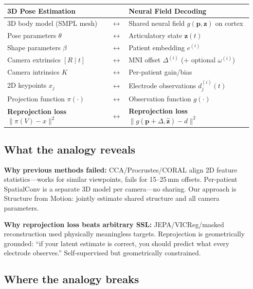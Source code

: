 \documentclass[11pt,letterpaper]{article}
\newcommand{\bfp}{\mathbf{p}}
\newcommand{\bfz}{\mathbf{z}}
\begin{document}
\begin{table}[h]\centering\small
\begin{tabular}{@{}p{}p{}p{}@{}}
\toprule
\textbf{3D Pose Estimation} & & \textbf{Neural Field Decoding} \\
\midrule
3D body model (SMPL mesh) & $\leftrightarrow$ & Shared neural field $g(\bfp, \bfz)$ on cortex \\[3pt]
Pose parameters $\theta$ & $\leftrightarrow$ & Articulatory state $\bfz(t)$ \\[3pt]
Shape parameters $\beta$ & $\leftrightarrow$ & Patient embedding $e^{(i)}$ \\[3pt]
Camera extrinsics $[R \mid t]$ & $\leftrightarrow$ & MNI offset $\Delta^{(i)}$ (+ optional $\omega^{(i)}$) \\[3pt]
Camera intrinsics $K$ & $\leftrightarrow$ & Per-patient gain/bias \\[3pt]
2D keypoints $x_j$ & $\leftrightarrow$ & Electrode observations $d_j^{(i)}(t)$ \\[3pt]
Projection function $\pi(\cdot)$ & $\leftrightarrow$ & Observation function $g(\cdot)$ \\[3pt]
\textbf{Reprojection loss} $\|\pi(V) - x\|^2$ & $\leftrightarrow$ & \textbf{Reprojection loss} $\|g(\bfp{+}\Delta, \hat{\bfz}) - d\|^2$ \\
\bottomrule
\end{tabular}
\end{table}

\subsection{What the analogy reveals}

\textbf{Why previous methods failed:} CCA/Procrustes/CORAL align 2D feature statistics---works for similar viewpoints, fails for 15--25\,mm offsets. Per-patient SpatialConv is a separate 3D model per camera---no sharing. Our approach is Structure from Motion: jointly estimate shared structure and all camera parameters.

\textbf{Why reprojection loss beats arbitrary SSL:} JEPA/VICReg/masked reconstruction used physically meaningless targets. Reprojection is geometrically grounded: ``if your latent estimate is correct, you should predict what every electrode observes.'' Self-supervised but geometrically constrained.

\subsection{Where the analogy breaks}\label{sec:disanalogies}
\end{document}
